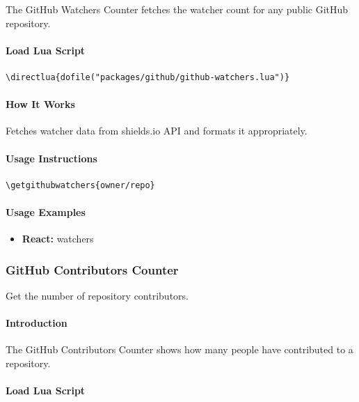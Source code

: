 \documentclass{article}
\begin{document}
The GitHub Watchers Counter fetches the watcher count for any public GitHub repository.

\paragraph{Load Lua Script}

\begin{verbatim}
\directlua{dofile("packages/github/github-watchers.lua")}
\end{verbatim}

\paragraph{How It Works}

Fetches watcher data from shields.io API and formats it appropriately.

\paragraph{Usage Instructions}

\begin{verbatim}
\getgithubwatchers{owner/repo}
\end{verbatim}

\paragraph{Usage Examples}

\begin{itemize}
    \item \textbf{React:}  watchers
\end{itemize}

\subsubsection{GitHub Contributors Counter}

Get the number of repository contributors.

\paragraph{Introduction}

The GitHub Contributors Counter shows how many people have contributed to a repository.

\paragraph{Load Lua Script}
\end{document}
